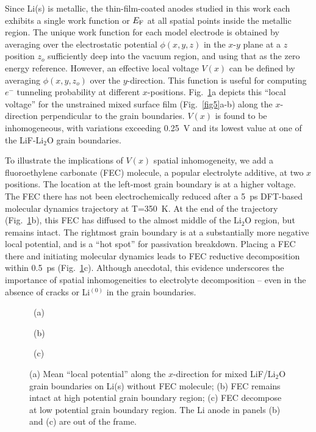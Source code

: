 \documentclass[prb,preprint,amsmath,amssymb]{revtex4}
\begin{document}
Since Li(s) is metallic, the thin-film-coated anodes studied in this work
each exhibits a single work function or $E_{\rm F}$ at all spatial points
inside the metallic region.  The unique work function for each model electrode
is obtained by averaging over the electrostatic potential $\phi(x,y,z)$ in the
$x$-$y$ plane at a $z$ position $z_o$ sufficiently deep into the vacuum
region, and using that as the zero energy reference.  However, an effective
local voltage $V(x)$ can be defined by averaging $\phi(x,y,z_o)$ over the
$y$-direction.  This function is useful for computing $e^-$ tunneling
probability at different $x$-positions.  Fig.~\ref{fig6}a depicts this
``local voltage'' for the unstrained mixed surface film (Fig.~\ref{fig5}a-b)
along the $x$-direction perpendicular to the grain boundaries.  $V(x)$ is
found to be inhomogeneous, with variations exceeding 0.25~V and its lowest
value at one of the LiF-Li$_2$O grain boundaries.

To illustrate the implications of $V(x)$ spatial inhomogeneity, we add
a fluoroethylene carbonate (FEC) molecule, a popular electrolyte
additive,\cite{fec1,fec2,fec3} at two $x$ positions.  The location at the
left-most grain boundary is at a higher voltage.  The FEC there has not
been electrochemically reduced after a 5~ps DFT-based molecular dynamics
trajectory at T=350~K.  At the end of the trajectory (Fig.~\ref{fig6}b),
this FEC has diffused to the almost middle of the Li$_2$O region, but
remains intact.  The rightmost grain boundary is at a substantially more
negative local potential, and is a ``hot spot'' for passivation breakdown.
Placing a FEC there and initiating molecular dynamics leads to FEC reductive
decomposition within 0.5~ps (Fig.~\ref{fig6}c).  Although anecdotal, this
evidence underscores the importance of spatial inhomogeneities to electrolyte
decomposition -- even in the absence of cracks or Li$^{(0)}$ in the grain
boundaries.

\begin{figure}
\centerline{\hbox{ \epsfxsize=3.00in  (a)}}
\centerline{\hbox{ \epsfxsize=3.00in  (b)}}
\centerline{\hbox{ \epsfxsize=3.00in  (c)}}
\caption[]
{\label{fig6} \noindent
(a) Mean ``local potential'' along the $x$-direction for
mixed LiF/Li$_2$O grain boundaries on Li(s) without FEC molecule;
(b) FEC remains intact at high potential grain boundary region;
(c) FEC decompose at low potential grain boundary region.
The Li anode in panels (b) and (c) are out of the frame.
}
\end{figure}
\end{document}

